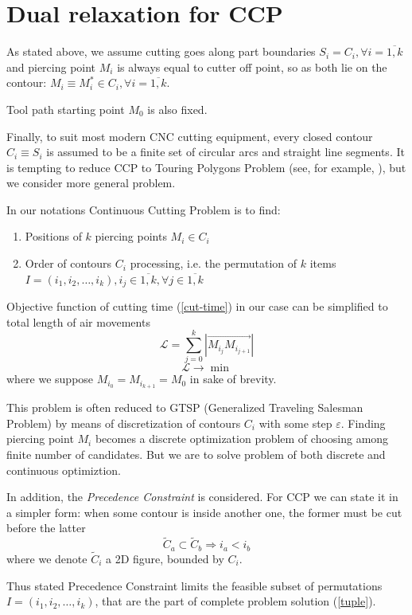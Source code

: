 \documentclass{ifacconf}
\begin{document}
\section{Dual relaxation for CCP}
As stated above,
we assume cutting goes along part boundaries
$S_i = C_i, \forall i=\overline{1, k}$
and piercing point $M_i$ is always equal to
cutter off point,
so as both lie on the contour:
$M_i \equiv M_i^* \in C_i, \forall i = \overline{1, k}$.

Tool path starting point $M_0$ is also fixed.

Finally,
to suit most modern CNC cutting equipment,
every closed contour $C_i \equiv S_i$
is assumed to be
a finite set of circular arcs
and straight line segments.
It is tempting to reduce
CCP to
Touring Polygons Problem
(see, for example, \cite{Qin2017Nov}),
but we consider more general problem.

In our notations Continuous Cutting Problem is to find:
\begin{enumerate}
  \item Positions of $k$ piercing points $M_i \in C_i$
  \item Order of contours $C_i$ processing,
  i.e. the permutation of $k$ items
  $I=(i_1, i_2, \dots, i_k),
    i_j \in \overline{1,k}, \forall j \in \overline{1,k}$
\end{enumerate}
Objective function of cutting time (\ref{cut-time})
in our case can be simplified to total length of air movements
$$
\mathcal L = \sum_{j=0}^k |\overrightarrow{M_{i_j} M_{i_{{j+1}}}}|
$$
$$
\mathcal L \to \min
$$
where we suppose
$M_{i_0} = M_{i_{k+1}} = M_0$
in sake of brevity.

This problem is often
reduced to GTSP
(Generalized Traveling Salesman Problem)
by means of
discretization of contours $C_i$
with some step $\varepsilon$.
Finding piercing point $M_i$
becomes a discrete optimization problem
of choosing among finite number of
candidates.
But we are to solve
problem of both discrete and
continuous optimiztion.

In addition,
the \textit{Precedence Constraint}
is considered.
For CCP we can state it in a simpler form:
when some contour is inside another one,
the former must be cut
before the latter
$$
\tilde C_a \subset \tilde C_b
\Rightarrow
i_a < i_b
$$
where we denote
$\tilde C_i$ a 2D figure,
bounded by $C_i$.

Thus stated Precedence Constraint
limits the feasible subset of permutations
$I=(i_1, i_2, \dots, i_k)$,
that are the part of
complete problem solution (\ref{tuple}).
\end{document}
